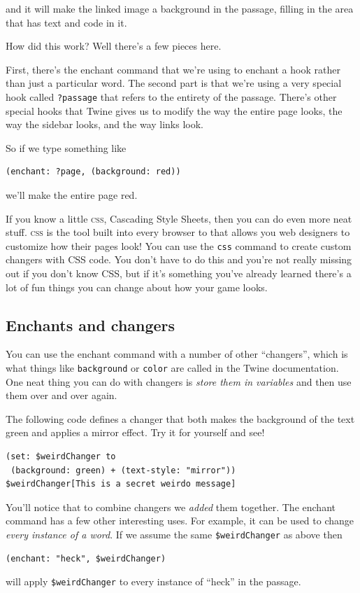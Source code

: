 \documentclass[a5paper,11pt]{article}
\begin{document}
and it will make the linked image a background in the passage, filling in the area that has text and code in it.

How did this work? Well there's a few pieces here.

First, there's the enchant command that we're using to enchant a hook rather than just a particular word. The second part is that we're using a very special hook called \verb"?passage" that refers to the entirety of the passage. There's other special hooks that Twine gives us to modify the way the entire page looks, the way the sidebar looks, and the way links look.

So if we type something like
\begin{verbatim}
(enchant: ?page, (background: red))
\end{verbatim}
we'll make the entire page red.

If you know a little \textsc{css}, Cascading Style Sheets, then you can do even more neat stuff. \textsc{css} is the tool built into every browser to that allows you web designers to customize how their pages look! You can use the \verb|css| command to create custom changers with CSS code. You don't have to do this and you're not really missing out if you don't know CSS, but if it's something you've already learned there's a lot of fun things you can change about how your game looks. 
\subsection{Enchants and changers}
You can use the enchant command with a number of other ``changers'', which is what things like \verb|background| or \verb|color| are called in the Twine documentation. One neat thing you can do with changers is \emph{store them in variables} and then use them over and over again.

The following code defines a changer that both makes the background of the text green and applies a mirror effect. Try it for yourself and see!
\begin{verbatim}
(set: $weirdChanger to 
 (background: green) + (text-style: "mirror"))
$weirdChanger[This is a secret weirdo message]
\end{verbatim}

You'll notice that to combine changers we \emph{added} them together. The enchant command has a few other interesting uses. For example, it can be used to change \emph{every instance of a word}. If we assume the same \verb|$weirdChanger| as above then
\begin{verbatim}
(enchant: "heck", $weirdChanger)
\end{verbatim}
will apply \verb|$weirdChanger| to every instance of ``heck'' in the passage. 
\end{document}

